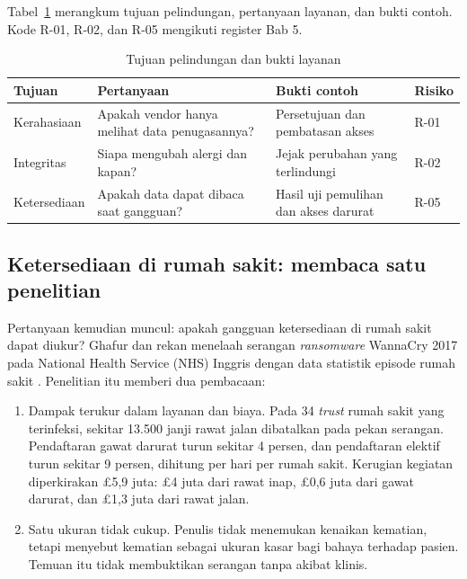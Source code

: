 Tabel~\ref{tab:ch06-tiga-tujuan} merangkum tujuan pelindungan, pertanyaan layanan, dan bukti
contoh. Kode R-01, R-02, dan R-05 mengikuti register Bab 5.

\begin{table}[!htb]
  \centering\small
  \caption{Tujuan pelindungan dan bukti layanan}\label{tab:ch06-tiga-tujuan}
  \begin{tabularx}{\textwidth}{|>{\raggedright\arraybackslash}p{}|>{\raggedright\arraybackslash}X|>{\raggedright\arraybackslash}X|>{\raggedright\arraybackslash}p{}|}
    \hline
    \textbf{Tujuan} & \textbf{Pertanyaan} & \textbf{Bukti contoh} & \textbf{Risiko} \\ \hline
    Kerahasiaan & Apakah vendor hanya melihat data penugasannya? & Persetujuan dan pembatasan
    akses & R-01 \\ \hline
    Integritas & Siapa mengubah alergi dan kapan? & Jejak perubahan yang terlindungi & R-02 \\
    \hline
    Ketersediaan & Apakah data dapat dibaca saat gangguan? & Hasil uji pemulihan dan akses darurat
    & R-05 \\ \hline
  \end{tabularx}
\end{table}

\subsection*{Ketersediaan di rumah sakit: membaca satu penelitian}

Pertanyaan kemudian muncul: apakah gangguan ketersediaan di rumah sakit dapat diukur? Ghafur dan
rekan menelaah serangan \textit{ransomware} WannaCry 2017 pada National Health Service (NHS) Inggris
dengan data statistik episode rumah sakit \cite{c06-ghafur2019}. Penelitian itu memberi dua
pembacaan:
\begin{enumerate}
  \item Dampak terukur dalam layanan dan biaya. Pada 34 \textit{trust} rumah sakit yang terinfeksi,
  sekitar 13.500 janji rawat jalan dibatalkan pada pekan serangan. Pendaftaran gawat darurat turun
  sekitar 4 persen, dan pendaftaran elektif turun sekitar 9 persen, dihitung per hari per rumah
  sakit. Kerugian kegiatan diperkirakan £5,9 juta: £4 juta dari rawat inap, £0,6 juta dari gawat
  darurat, dan £1,3 juta dari rawat jalan.
  \item Satu ukuran tidak cukup. Penulis tidak menemukan kenaikan kematian, tetapi menyebut kematian
  sebagai ukuran kasar bagi bahaya terhadap pasien. Temuan itu tidak membuktikan serangan tanpa
  akibat klinis.
\end{enumerate}

